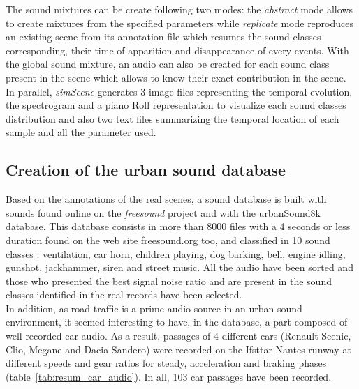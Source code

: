 \documentclass[a4,11pt,twocolumn]{article}
\begin{document}
The sound mixtures can be create following two modes: the \textit{abstract} mode allows to create mixtures from the specified parameters while \textit{replicate} mode reproduces an existing scene from its annotation file which resumes the sound classes corresponding, their time of apparition and disappearance of every events. With the global sound mixture, an audio can also be created for each sound class present in the scene which allows to know their exact contribution in the scene. In parallel, \textit{simScene} generates 3 image files representing the temporal evolution, the spectrogram and a piano Roll representation to visualize each sound classes distribution and also two text files summarizing the temporal location of each sample and all the parameter used. \\

\subsection{Creation of the urban sound database}
Based on the annotations of the real scenes, a sound database is built with sounds found online on the \textit{freesound} project and with the urbanSound8k database\cite{salamon_dataset_nodate}. This database consists in more than 8000 files with a 4 seconds or less duration found on the web site freesound.org too, and classified in 10 sound classes : ventilation, car horn, children playing, dog barking, bell, engine idling, gunshot, jackhammer, siren and street music. All the audio have been sorted and those who presented the best signal noise ratio and are present in the sound classes identified in the real records have been selected.\\

In addition, as road traffic is a prime audio source in an urban sound environment, it seemed interesting to have, in the database, a part composed of well-recorded car audio. As a result, passages of 4 different cars (Renault Scenic, Clio, Megane and Dacia Sandero) were recorded on the Ifsttar-Nantes runway at different speeds and gear ratios for steady, acceleration and braking phases (table~\ref{tab:resum_car_audio}). In all, 103 car passages have been recorded. \\
\end{document}
